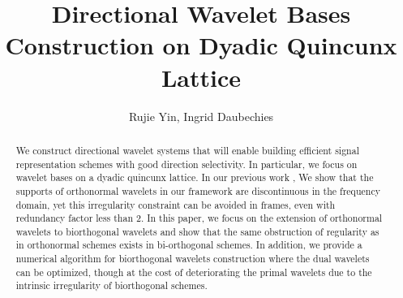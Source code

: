 \documentclass[]{article}
\begin{document}
\newtheorem{lem}{Lemma}
\newtheorem*{mydef}{Definition}
\newtheorem{thm}{Theorem}
\newtheorem{prop}{Proposition}
\newtheorem*{notat}{Notation}

\abovedisplayskip=2pt
\belowdisplayskip=2pt
\abovedisplayshortskip=2pt
\belowdisplayshortskip=2pt


\title{Directional Wavelet Bases Construction on Dyadic Quincunx Lattice}
\author{Rujie Yin, Ingrid Daubechies}
\maketitle

\begin{abstract}
We construct directional wavelet systems that will enable building efficient signal representation schemes with good direction selectivity. In particular, we focus on wavelet bases on a dyadic quincunx lattice.
In our previous work \cite{yin2014orthshear}, We show that the supports of orthonormal wavelets in our framework are discontinuous in the frequency domain, yet this irregularity constraint can be avoided in frames, even with redundancy factor less than 2. In this paper, we focus on the extension of orthonormal wavelets to biorthogonal wavelets and show that the same obstruction of regularity as in orthonormal schemes exists in bi-orthogonal schemes. In addition, we provide a numerical algorithm for biorthogonal wavelets construction where the dual wavelets can be optimized, though at the cost of deteriorating the primal wavelets due to the intrinsic irregularity of biorthogonal schemes.
\end{abstract}




%


%


%


%


%

\clearpage
\newpage
\begin{appendices}




%
%
\end{appendices}



\newpage
\end{document}
